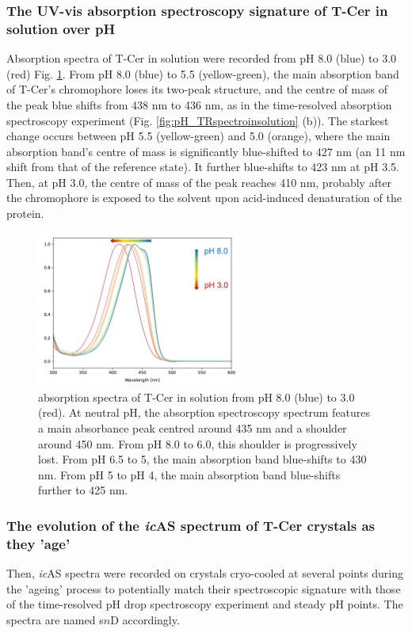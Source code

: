 \subsubsection{The UV-vis absorption spectroscopy signature of T-Cer in solution over pH}
Absorption spectra of T-Cer in solution were recorded from pH 8.0 (blue) to 3.0 (red) Fig. \ref{fig:T-Cer_insolution_pH_static}. From pH 8.0 (blue) to 5.5 (yellow-green), the main absorption band of T-Cer's chromophore loses its two-peak structure, and the centre of mass of the peak blue shifts from 438 nm to 436 nm, as in the time-resolved absorption spectroscopy experiment (Fig. \ref{fig:pH_TRspectroinsolution} (b)). The starkest change occurs between pH 5.5 (yellow-green) and 5.0 (orange), where the main absorption band's centre of mass is significantly blue-shifted to 427 nm (an 11 nm shift from that of the reference state). It further blue-shifts to 423 nm at pH 3.5. Then, at pH 3.0, the centre of mass of the peak reaches 410 nm, probably after the chromophore is exposed to the solvent upon acid-induced denaturation of the protein.
\begin{figure}[H] %
    \centering
        \noindent \includegraphics[width=0.6\textwidth]{images/T-Cer/In_solution_static_T-Cer.pdf}
    \hfill
    \caption{absorption spectra of T-Cer in solution from pH 8.0 (blue) to 3.0 (red). At neutral pH, the absorption spectroscopy spectrum features a main absorbance peak centred around 435 nm and a shoulder around 450 nm. From pH 8.0 to 6.0, this shoulder is progressively lost. From pH 6.5 to 5, the main absorption band blue-shifts to 430 nm. From pH 5 to pH 4, the main absorption band blue-shifts further to 425 nm.}
    \label{fig:T-Cer_insolution_pH_static}
\end{figure}

\subsubsection{The evolution of the \textit{ic}AS spectrum of T-Cer crystals as they 'age'}
Then, \textit{ic}AS spectra were recorded on crystals cryo-cooled at several points during the 'ageing' process to potentially match their spectroscopic signature with those of the time-resolved pH drop spectroscopy experiment and steady pH points. The spectra are named s\(n\)D accordingly.

